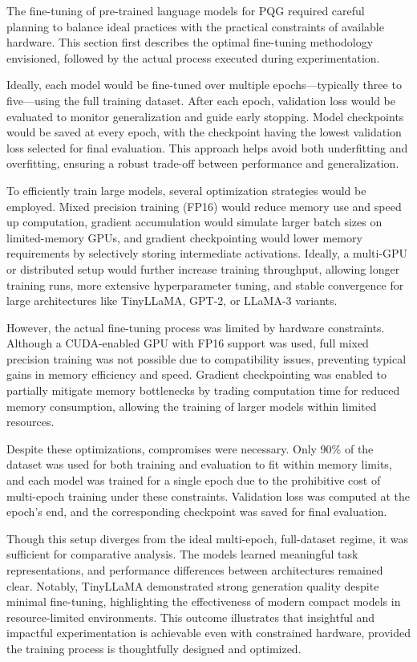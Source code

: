 The fine-tuning of pre-trained language models for PQG required careful planning to
balance ideal practices with the practical constraints of available hardware. This section
first describes the optimal fine-tuning methodology envisioned, followed by the actual
process executed during experimentation.

Ideally, each model would be fine-tuned over multiple epochs—typically three to
five—using the full training dataset. After each epoch, validation loss would be evaluated
to monitor generalization and guide early stopping. Model checkpoints would be
saved at every epoch, with the checkpoint having the lowest validation loss selected for
final evaluation. This approach helps avoid both underfitting and overfitting, ensuring a
robust trade-off between performance and generalization.

To efficiently train large models, several optimization strategies would be employed.
Mixed precision training (FP16) would reduce memory use and speed up computation,
gradient accumulation would simulate larger batch sizes on limited-memory GPUs, and
gradient checkpointing would lower memory requirements by selectively storing intermediate
activations. Ideally, a multi-GPU or distributed setup would further increase
training throughput, allowing longer training runs, more extensive hyperparameter tuning,
and stable convergence for large architectures like TinyLLaMA, GPT-2, or LLaMA-3
variants.

However, the actual fine-tuning process was limited by hardware constraints. Although
a CUDA-enabled GPU with FP16 support was used, full mixed precision training was
not possible due to compatibility issues, preventing typical gains in memory efficiency
and speed. Gradient checkpointing was enabled to partially mitigate memory bottlenecks
by trading computation time for reduced memory consumption, allowing the training of
larger models within limited resources.

Despite these optimizations, compromises were necessary. Only 90\% of the dataset
was used for both training and evaluation to fit within memory limits, and each model
was trained for a single epoch due to the prohibitive cost of multi-epoch training under
these constraints. Validation loss was computed at the epoch's end, and the corresponding
checkpoint was saved for final evaluation.

Though this setup diverges from the ideal multi-epoch, full-dataset regime, it was
sufficient for comparative analysis. The models learned meaningful task representations,
and performance differences between architectures remained clear. Notably, TinyLLaMA
demonstrated strong generation quality despite minimal fine-tuning, highlighting the effectiveness
of modern compact models in resource-limited environments. This outcome
illustrates that insightful and impactful experimentation is achievable even with constrained
hardware, provided the training process is thoughtfully designed and optimized.

